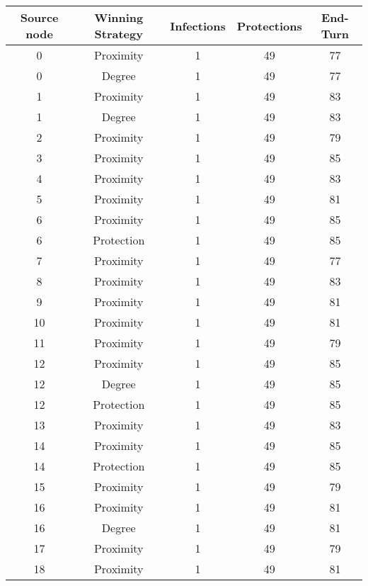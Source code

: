 \documentclass[results.tex]{subfiles}
\begin{document}
\begin{center}
  \begin{tabular}{| c || c | c | c | c |}
    \hline
    {\bfseries Source node} & {\bfseries Winning Strategy} & {\bfseries Infections} & {\bfseries Protections} & {\bfseries End-Turn} \\  %
    \hline\hline
    0 & Proximity & 1 & 49 & 77 \\ 
    \hline
    0 & Degree & 1 & 49 & 77 \\ 
    \hline
    1 & Proximity & 1 & 49 & 83 \\ 
    \hline
    1 & Degree & 1 & 49 & 83 \\ 
    \hline
    2 & Proximity & 1 & 49 & 79 \\ 
    \hline
    3 & Proximity & 1 & 49 & 85 \\ 
    \hline
    4 & Proximity & 1 & 49 & 83 \\ 
    \hline
    5 & Proximity & 1 & 49 & 81 \\ 
    \hline
    6 & Proximity & 1 & 49 & 85 \\ 
    \hline
    6 & Protection & 1 & 49 & 85 \\ 
    \hline
    7 & Proximity & 1 & 49 & 77 \\ 
    \hline
    8 & Proximity & 1 & 49 & 83 \\ 
    \hline
    9 & Proximity & 1 & 49 & 81 \\ 
    \hline
    10 & Proximity & 1 & 49 & 81 \\ 
    \hline
    11 & Proximity & 1 & 49 & 79 \\ 
    \hline
    12 & Proximity & 1 & 49 & 85 \\ 
    \hline
    12 & Degree & 1 & 49 & 85 \\ 
    \hline
    12 & Protection & 1 & 49 & 85 \\ 
    \hline
    13 & Proximity & 1 & 49 & 83 \\ 
    \hline
    14 & Proximity & 1 & 49 & 85 \\ 
    \hline
    14 & Protection & 1 & 49 & 85 \\ 
    \hline
    15 & Proximity & 1 & 49 & 79 \\ 
    \hline
    16 & Proximity & 1 & 49 & 81 \\ 
    \hline
    16 & Degree & 1 & 49 & 81 \\ 
    \hline
    17 & Proximity & 1 & 49 & 79 \\ 
    \hline
    18 & Proximity & 1 & 49 & 81 \\ 

\end{tabular}
\end{center}
\end{document}
